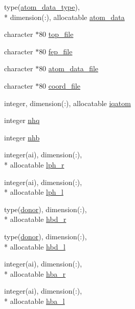 \begin{DoxyCompactItemize}
\item 
type(\hyperlink{structcalc__xscore_1_1atom__data__type}{atom\-\_\-data\-\_\-type}), \\*
dimension(\-:), allocatable \hyperlink{classcalc__xscore_a4c371c592ca6bf193cabc56235abdfd3}{atom\-\_\-data}
\item 
character $\ast$80 \hyperlink{classcalc__xscore_a498fbcaf83d5f0f7c5495059dd9d450b}{top\-\_\-file}
\item 
character $\ast$80 \hyperlink{classcalc__xscore_ac40449476371b2a1cf9adb8ef4ba3b4a}{fep\-\_\-file}
\item 
character $\ast$80 \hyperlink{classcalc__xscore_a3d333182ec47537c3c37dcc86e03338f}{atom\-\_\-data\-\_\-file}
\item 
character $\ast$80 \hyperlink{classcalc__xscore_a2166cde8bb47c9165d2c458a305b585b}{coord\-\_\-file}
\item 
integer, dimension(\-:), allocatable \hyperlink{classcalc__xscore_a4da394dcce18b72644eda3244d49533d}{iqatom}
\item 
integer \hyperlink{classcalc__xscore_a18bf961e2574d67d3cb2eac738792ac6}{nhq}
\item 
integer \hyperlink{classcalc__xscore_aa4ece0e20bb585fbdda7d11682bcac6c}{nhb}
\item 
integer(ai), dimension(\-:), \\*
allocatable \hyperlink{classcalc__xscore_af54cb6976b82ec91add995e128a48ce3}{lph\-\_\-r}
\item 
integer(ai), dimension(\-:), \\*
allocatable \hyperlink{classcalc__xscore_ac3d7b816ffb1e654a5c9364fe2b7333c}{lph\-\_\-l}
\item 
type(\hyperlink{structcalc__xscore_1_1donor}{donor}), dimension(\-:), \\*
allocatable \hyperlink{classcalc__xscore_a3e2ad3dad04d694936a330ec41ec9c26}{hbd\-\_\-r}
\item 
type(\hyperlink{structcalc__xscore_1_1donor}{donor}), dimension(\-:), \\*
allocatable \hyperlink{classcalc__xscore_a9018215ff9ce2915690c96b249fb84f4}{hbd\-\_\-l}
\item 
integer(ai), dimension(\-:), \\*
allocatable \hyperlink{classcalc__xscore_a3c3633756176c30b563ff354b54a3e04}{hba\-\_\-r}
\item 
integer(ai), dimension(\-:), \\*
allocatable \hyperlink{classcalc__xscore_ae41e35e1394bdb773577bb2530c7789b}{hba\-\_\-l}

\end{DoxyCompactItemize}
